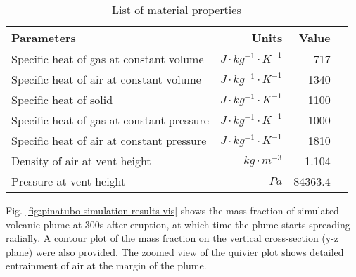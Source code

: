 \begin{table}[htp]
\centering
	\begin{centering}
      \caption{List of material properties}		
	  \begin{tabular}{lrrr}
	    \hline
	    Parameters & Units  & Value \\
	    \hline
	    	Specific heat of gas at constant volume     & $J \cdot kg^{-1}\cdot K^{-1}$& 717     \\
	    Specific heat of air at constant volume     & $J \cdot kg^{-1}\cdot K^{-1}$& 1340    \\
	    	Specific heat of solid                      & $J \cdot kg^{-1}\cdot K^{-1}$& 1100    \\
	    	Specific heat of gas at constant pressure   & $J \cdot kg^{-1}\cdot K^{-1}$& 1000    \\
	    	Specific heat of air at constant pressure   & $J \cdot kg^{-1}\cdot K^{-1}$& 1810    \\
	    	Density of air at vent height               & $kg \cdot m^{-3}$       & 1.104   \\
	    Pressure at vent height                        & $Pa$              & 84363.4 \\
	    \hline
	  \end{tabular}
	  \label{tab:material_properties}
	\end{centering}
\end{table}

Fig. \ref{fig:pinatubo-simulation-results-vis} shows the mass fraction of simulated volcanic plume at 300s after eruption, at which time the plume starts spreading radially. A contour plot of the mass fraction on the vertical cross-section (y-z plane) were also provided. The zoomed view of the quivier plot shows detailed entrainment of air at the margin of the plume.

